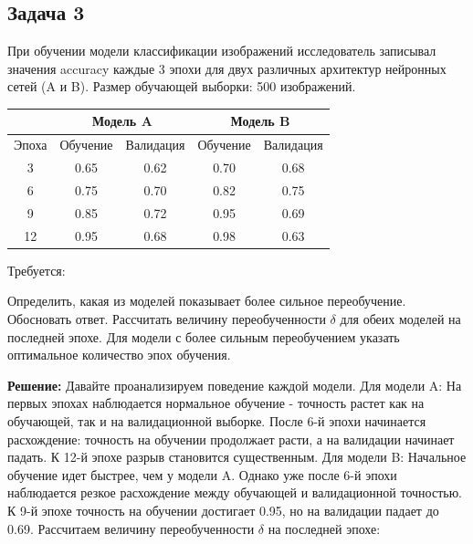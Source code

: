 \subsection*{Задача 3}
При обучении модели классификации изображений исследователь записывал значения accuracy каждые 3 эпохи для двух различных архитектур нейронных сетей (A и B). Размер обучающей выборки: 500 изображений.
\begin{center}
    \begin{tabular}{|c|c|c|c|c|}
        \hline
              & \multicolumn{2}{|c|}{Модель A} & \multicolumn{2}{|c|}{Модель B}                        \\
        \hline
        Эпоха & Обучение                       & Валидация                      & Обучение & Валидация \\
        \hline
        3     & 0.65                           & 0.62                           & 0.70     & 0.68      \\
        6     & 0.75                           & 0.70                           & 0.82     & 0.75      \\
        9     & 0.85                           & 0.72                           & 0.95     & 0.69      \\
        12    & 0.95                           & 0.68                           & 0.98     & 0.63      \\
        \hline
    \end{tabular}
\end{center}
Требуется:

Определить, какая из моделей показывает более сильное переобучение. Обосновать ответ.
Рассчитать величину переобученности $\delta$ для обеих моделей на последней эпохе.
Для модели с более сильным переобучением указать оптимальное количество эпох обучения.

\textbf{Решение:}
Давайте проанализируем поведение каждой модели.
Для модели A:
На первых эпохах наблюдается нормальное обучение - точность растет как на обучающей, так и на валидационной выборке. После 6-й эпохи начинается расхождение: точность на обучении продолжает расти, а на валидации начинает падать. К 12-й эпохе разрыв становится существенным.
Для модели B:
Начальное обучение идет быстрее, чем у модели A. Однако уже после 6-й эпохи наблюдается резкое расхождение между обучающей и валидационной точностью. К 9-й эпохе точность на обучении достигает 0.95, но на валидации падает до 0.69.
Рассчитаем величину переобученности $\delta$ на последней эпохе:

